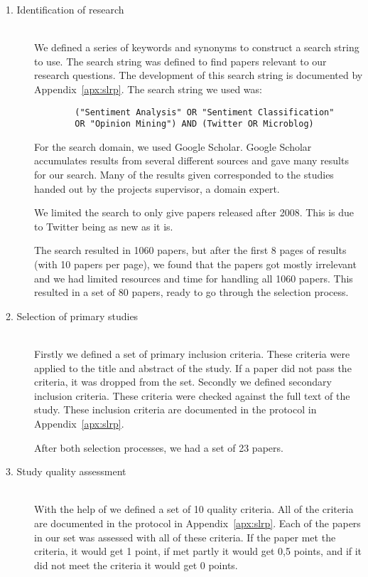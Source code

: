\begin{description}

	\item[1. Identification of research] \hfill \\
		We defined a series of keywords and synonyms to construct a search string to use. The search string was defined to find papers relevant to our research questions. The development of this search string is documented by Appendix~\ref{apx:slrp}. The search string we used was:
		
		\begin{verbatim}
		("Sentiment Analysis" OR "Sentiment Classification" 
		OR "Opinion Mining") AND (Twitter OR Microblog)
		\end{verbatim}
		
		For the search domain, we used Google Scholar. Google Scholar accumulates results from several different sources and gave many results for our search. Many of the results given corresponded to the studies handed out by the projects supervisor, a domain expert. 
		
		We limited the search to only give papers released after 2008. This is due to Twitter being as new as it is.
		
		The search resulted in 1060 papers, but after the first 8 pages of results (with 10 papers per page), we found that the papers got mostly irrelevant and we had limited resources and time for handling all 1060 papers. This resulted in a set of 80 papers, ready to go through the selection process.
		
		

	\item[2. Selection of primary studies] \hfill \\
		Firstly we defined a set of primary inclusion criteria. These criteria were applied to the title and abstract of the study. If a paper did not pass the criteria, it was dropped from the set. Secondly we defined secondary inclusion criteria. These criteria were checked against the full text of the study. These inclusion criteria are documented in the protocol in Appendix~\autoref{apx:slrp}. 
		
		After both selection processes, we had a set of 23 papers. 

	\item[3. Study quality assessment] \hfill \\
		With the help of \cite{paper:slrdesc} we defined a set of 10 quality criteria. All of the criteria are documented in the protocol in Appendix~\autoref{apx:slrp}. Each of the papers in our set was assessed with all of these criteria. If the paper met the criteria, it would get 1 point, if met partly it would get 0,5 points, and if it did not meet the criteria it would get 0 points. 
		

\end{description}
